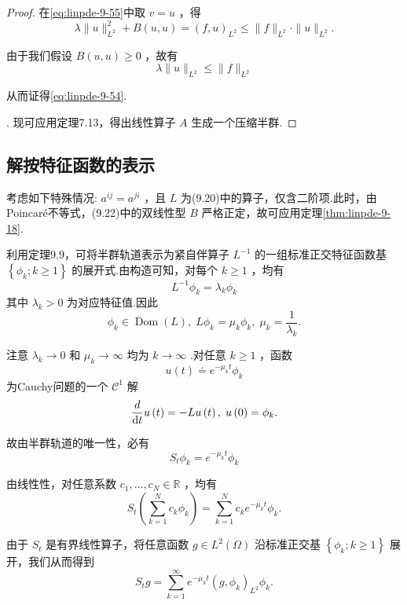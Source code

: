 \begin{proof}
在\eqref{eq:linpde-9-55}中取 $v = u$ ，得
\[
\lambda \| u{\| }_{{L}^{2}}^{2} + B\left(  {u,u}\right)   = {\left( f,u\right) }_{{L}^{2}} \leq  \| f{\| }_{{L}^{2}} \cdot  \| u{\| }_{{L}^{2}}.
\]

由于我们假设 $B\left(  {u,u}\right)   \geq  0$ ，故有
\[
\lambda \| u{\| }_{{L}^{2}} \leq  \| f{\| }_{{L}^{2}}
\]

从而证得\eqref{eq:linpde-9-54}.

. 现可应用定理7.13，得出线性算子 $A$ 生成一个压缩半群.
\end{proof}

\vspace{-0.25 em}
\subsection{解按特征函数的表示}
考虑如下特殊情况: ${a}^{ij} = {a}^{ji}$ ，且 $L$ 为(9.20)中的算子，仅含二阶项.此时，由Poincaré不等式，(9.22)中的双线性型 $B$ 严格正定，故可应用定理\ref{thm:linpde-9-18}.

利用定理9.9，可将半群轨道表示为紧自伴算子 ${L}^{-1}$ 的一组标准正交特征函数基 $\left\{  {{\phi }_{k};k \geq  1}\right\}$ 的展开式.由构造可知，对每个 $k \geq  1$ ，均有
\[
{L}^{-1}{\phi }_{k} = {\lambda }_{k}{\phi }_{k}
\]
其中 ${\lambda }_{k} > 0$ 为对应特征值.因此
\begin{equation}\tag{9.56}\label{eq:linpde-9-56}
{\phi }_{k} \in  \operatorname{Dom}\left( L\right) ,\;L{\phi }_{k} = {\mu }_{k}{\phi }_{k},\;{\mu }_{k} = \frac{1}{{\lambda }_{k}}.
\end{equation}

注意 ${\lambda }_{k} \rightarrow  0$ 和 ${\mu }_{k} \rightarrow  \infty$ 均为 $k \rightarrow  \infty$ .对任意 $k \geq  1$ ，函数
\[
u\left( t\right)  \doteq  {e}^{-{\mu }_{k}t}{\phi }_{k}
\]
为Cauchy问题的一个 ${\mathcal{C}}^{1}$ 解
\[
\frac{d}{\mathop{}\!\mathrm{d} t}u\left( t\right)  =  - {Lu}\left( t\right) ,\;u\left( 0\right)  = {\phi }_{k}.
\]

故由半群轨道的唯一性，必有
\[
{S}_{t}{\phi }_{k} = {e}^{-{\mu }_{k}t}{\phi }_{k}
\]

由线性性，对任意系数 ${c}_{1},\ldots ,{c}_{N} \in  \mathbb{R}$ ，均有
\[
{S}_{t}\left( {\sum_{{k = 1}}^{N}{c}_{k}{\phi }_{k}}\right)  = \sum_{{k = 1}}^{N}{c}_{k}{e}^{-{\mu }_{k}t}{\phi }_{k}.
\]

由于 ${S}_{t}$ 是有界线性算子，将任意函数 $g \in  {L}^{2}\left( \Omega \right)$ 沿标准正交基 $\left\{  {{\phi }_{k};k \geq  1}\right\}$ 展开，我们从而得到
\begin{equation}\tag{9.57}\label{eq:linpde-9-57}
{S}_{t}g = \sum_{{k = 1}}^{\infty }{e}^{-{\mu }_{k}t}{\left( g,{\phi }_{k}\right) }_{{L}^{2}}{\phi }_{k}.
\end{equation}

